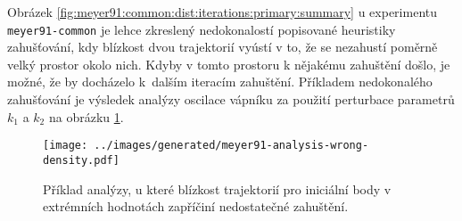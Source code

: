 Obrázek \ref{fig:meyer91:common:dist:iterations:primary:summary} u experimentu \texttt{meyer91-common} je lehce
zkreslený nedokonalostí popisované heuristiky zahušťování, kdy blízkost dvou trajektorií vyústí v to,
že se nezahustí poměrně velký prostor okolo nich. Kdyby v tomto prostoru k nějakému zahuštění došlo,
je možné, že by docházelo k~dalším iteracím zahuštění. Příkladem nedokonalého zahušťování je vý\-sle\-dek
analýzy oscilace vápníku za použití perturbace parametrů $k_1$ a $k_2$ na obrázku \ref{fig:meyer91:analysis:wrong:density}.

\begin{figure}[h!]
\begin{center}
	\texttt{[image: ../images/generated/meyer91-analysis-wrong-density.pdf]}
	\caption{Příklad analýzy, u které blízkost trajektorií pro iniciální body v extrémních hodnotách zapříčiní nedostatečné zahuštění.}
	\label{fig:meyer91:analysis:wrong:density}
\end{center}
\end{figure}

